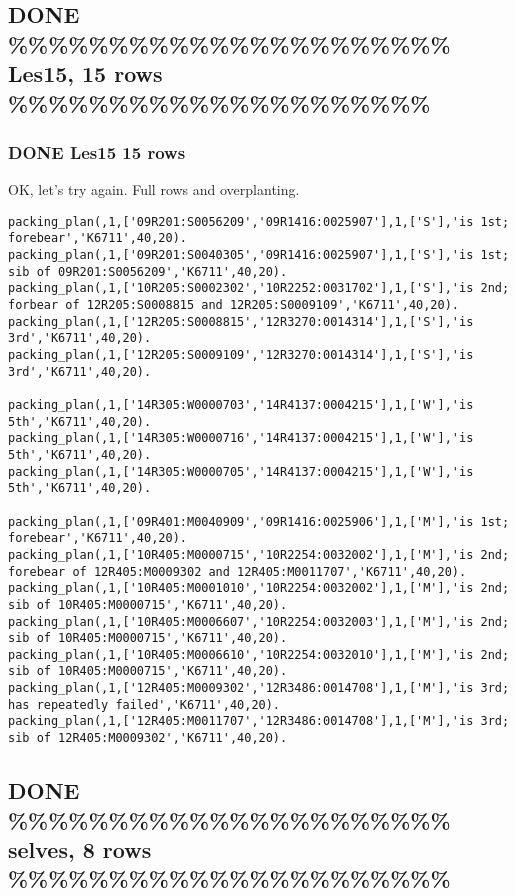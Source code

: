 \documentclass[11pt]{article}
\begin{document}
\subsection{{\bfseries\sffamily DONE} \%\%\%\%\%\%\%\%\%\%\%\%\%\%\%\%\%\%\%\%\%\% Les15, 15 rows \%\%\%\%\%\%\%\%\%\%\%\%\%\%\%\%\%\%\%\%\%}
\label{sec-4-2}

\subsubsection{{\bfseries\sffamily DONE} Les15 15 rows}
\label{sec-4-2-1}

OK, let's try again.  Full rows and overplanting.

\begin{verbatim}
packing_plan(,1,['09R201:S0056209','09R1416:0025907'],1,['S'],'is 1st; forebear','K6711',40,20).
packing_plan(,1,['09R201:S0040305','09R1416:0025907'],1,['S'],'is 1st; sib of 09R201:S0056209','K6711',40,20).
packing_plan(,1,['10R205:S0002302','10R2252:0031702'],1,['S'],'is 2nd; forbear of 12R205:S0008815 and 12R205:S0009109','K6711',40,20).
packing_plan(,1,['12R205:S0008815','12R3270:0014314'],1,['S'],'is 3rd','K6711',40,20).
packing_plan(,1,['12R205:S0009109','12R3270:0014314'],1,['S'],'is 3rd','K6711',40,20).

packing_plan(,1,['14R305:W0000703','14R4137:0004215'],1,['W'],'is 5th','K6711',40,20).
packing_plan(,1,['14R305:W0000716','14R4137:0004215'],1,['W'],'is 5th','K6711',40,20).
packing_plan(,1,['14R305:W0000705','14R4137:0004215'],1,['W'],'is 5th','K6711',40,20).

packing_plan(,1,['09R401:M0040909','09R1416:0025906'],1,['M'],'is 1st; forebear','K6711',40,20).
packing_plan(,1,['10R405:M0000715','10R2254:0032002'],1,['M'],'is 2nd; forebear of 12R405:M0009302 and 12R405:M0011707','K6711',40,20).
packing_plan(,1,['10R405:M0001010','10R2254:0032002'],1,['M'],'is 2nd; sib of 10R405:M0000715','K6711',40,20).
packing_plan(,1,['10R405:M0006607','10R2254:0032003'],1,['M'],'is 2nd; sib of 10R405:M0000715','K6711',40,20).
packing_plan(,1,['10R405:M0006610','10R2254:0032010'],1,['M'],'is 2nd; sib of 10R405:M0000715','K6711',40,20).
packing_plan(,1,['12R405:M0009302','12R3486:0014708'],1,['M'],'is 3rd; has repeatedly failed','K6711',40,20).
packing_plan(,1,['12R405:M0011707','12R3486:0014708'],1,['M'],'is 3rd; sib of 12R405:M0009302','K6711',40,20).
\end{verbatim}



\subsection{{\bfseries\sffamily DONE} \%\%\%\%\%\%\%\%\%\%\%\%\%\%\%\%\%\%\%\%\%\% selves, 8 rows \%\%\%\%\%\%\%\%\%\%\%\%\%\%\%\%\%\%\%\%\%\%}
\label{sec-4-3}
\end{document}

